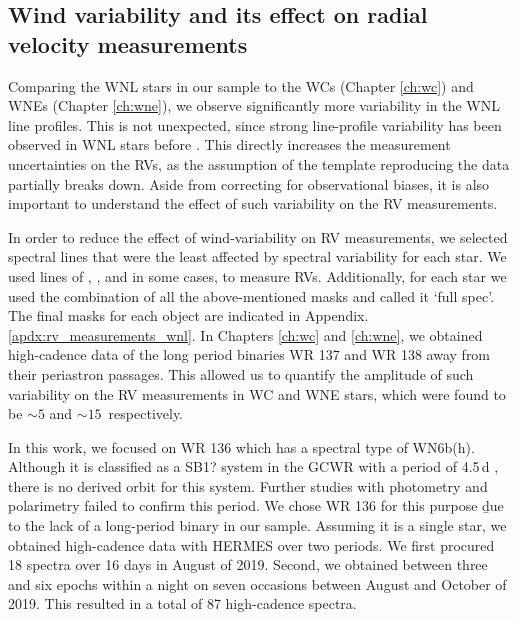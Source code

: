 \subsection{Wind variability and its effect on radial velocity measurements}

Comparing the WNL stars in our sample to the WCs (Chapter \ref{ch:wc}) and WNEs (Chapter \ref{ch:wne}), we observe significantly more variability in the WNL line profiles. This is not unexpected, since strong line-profile variability has been observed in WNL stars before \citep[][]{st-louis_systematic_2009,chene_systematic_2011,2014michaux,2020chene}. This directly increases the measurement uncertainties on the RVs, as the assumption of the template reproducing the data partially breaks down. Aside from correcting for observational biases, it is also important to understand the effect of such variability on the RV measurements.

In order to reduce the effect of wind-variability on RV measurements, we selected spectral lines that were the least affected by spectral variability for each star. We used lines of \heii{}, \niii{}, \niv{} and in some cases, \nv{} to measure RVs. Additionally, for each star we used the combination of all the above-mentioned masks and called it `full spec'. The final masks for each object are indicated in Appendix. \ref{apdx:rv_measurements_wnl}. In Chapters \ref{ch:wc} and \ref{ch:wne}, we obtained high-cadence data of the long period binaries WR 137 and WR 138 away from their periastron passages. This allowed us to quantify the amplitude of such variability on the RV measurements in WC and WNE stars, which were found to be ${\sim}5$ and ${\sim}15$\,\kms{} respectively.

In this work, we focused on WR 136 which has a spectral type of WN6b(h). Although it is classified as a SB1? system in the GCWR with a period of 4.5\,d \citep{koenigsberger_spectral_1980,aslanov_hd_1981}, there is no derived orbit for this system. Further studies with photometry \citep{moffat_photometric_1986} and polarimetry \citep{robert_polarization_1989} failed to confirm this period. We chose WR 136 for this purpose \b{due to the lack of a long-period binary} in our sample. Assuming it is a single star, we obtained high-cadence data with HERMES over two periods. We first procured 18 spectra over 16 days in August of 2019. Second, we obtained between three and six epochs within a night on seven occasions between August and October of 2019. This resulted in a total of 87 high-cadence spectra.


